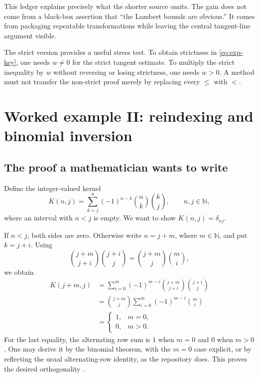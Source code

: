 \documentclass[11pt,a4paper]{article}
\newcommand{\NN}{\mathbb N}
\begin{document}
This ledger explains precisely what the shorter source omits. The gain does not come from a black-box assertion that ``the Lambert bounds are obvious.'' It comes from packaging repeatable transformations while leaving the central tangent-line argument visible.

The strict version provides a useful stress test. To obtain strictness in \eqref{eq:exp-key}, one needs $w\ne0$ for the strict tangent estimate. To multiply the strict inequality by $w$ without reversing or losing strictness, one needs $w>0$. A method must not transfer the non-strict proof merely by replacing every $\le$ with $<$.

\section{Worked example II: reindexing and binomial inversion}
\label{sec:binomial}

\subsection{The proof a mathematician wants to write}

Define the integer-valued kernel
\[
 K(n,j)=\sum_{k=j}^{n}(-1)^{n-k}\binom nk\binom kj,
 \qquad n,j\in\NN,
\]
where an interval with $n<j$ is empty. We want to show $K(n,j)=\delta_{nj}$.

If $n<j$, both sides are zero. Otherwise write $n=j+m$, where $m\in\NN$, and put $k=j+i$. Using
\[
 \binom{j+m}{j+i}\binom{j+i}{j}
 =\binom{j+m}{j}\binom mi,
\]
we obtain
\begin{align*}
 K(j+m,j)
 &=\sum_{i=0}^{m}(-1)^{m-i}
     \binom{j+m}{j+i}\binom{j+i}{j}\\
 &=\binom{j+m}{j}\sum_{i=0}^{m}(-1)^{m-i}\binom mi\\
 &=\begin{cases}1,&m=0,\\0,&m>0.\end{cases}
\end{align*}
For the last equality, the alternating row sum is $1$ when $m=0$ and $0$ when $m>0$. One may derive it by the binomial theorem, with the $m=0$ case explicit, or by reflecting the usual alternating-row identity, as the repository does. This proves the desired orthogonality \cite{srcbinomial}.
\end{document}
